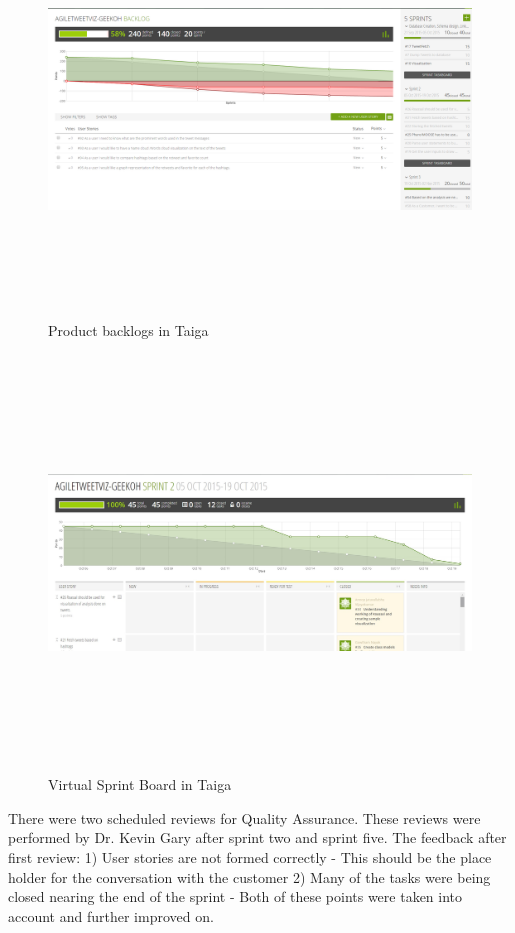 \documentclass[11pt]{article}
\begin{document}
\begin{figure}[!ht]
\centering
\includegraphics[height=11cm]{Backlog.png}
\caption{Product backlogs in Taiga\cite{TaigaSite}}
\end{figure}

\begin{figure}[!ht]
\centering
\includegraphics[height=11cm]{SprintBoard.jpg}
\caption{Virtual Sprint Board in Taiga\cite{TaigaSite}}
\end{figure}

There were two scheduled reviews for Quality Assurance. These reviews were performed by Dr. Kevin Gary after sprint two and sprint five. The feedback after first review: 1) User stories are not formed correctly - This should be the place holder for the conversation with the customer 2) Many of the tasks were being closed nearing the end of the sprint - Both of these points were taken into account and further improved on. 
\end{document}
